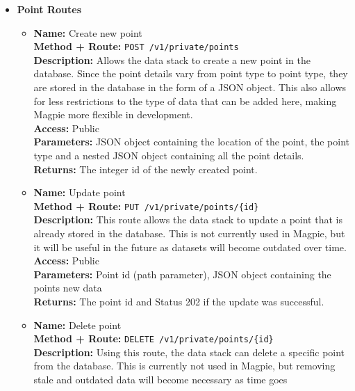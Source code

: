 \begin{itemize}
  \item {
    \textbf{Point Routes}
    \begin{itemize}
      \item {
        \textbf{Name:} Create new point\\
        \textbf{Method + Route:} \texttt{POST /v1/private/points}\\
        \textbf{Description:} Allows the data stack to create a new point in the
        database. Since the point details vary from point type to point type,
        they are stored in the database in the form of a JSON object. This also
        allows for less restrictions to the type of data that can be added here,
        making Magpie more flexible in development.\\
        \textbf{Access:} Public\\
        \textbf{Parameters:} JSON object containing the location of the point,
        the point type and a nested JSON object containing all the point
        details.\\
        \textbf{Returns:} The integer id of the newly created point.\\
      }
      \item {
        \textbf{Name:} Update point\\
        \textbf{Method + Route:} \texttt{PUT /v1/private/points/\{id\}}\\
        \textbf{Description:} This route allows the data stack to update a point
        that is already stored in the database. This is not currently used in
        Magpie, but it will be useful in the future as datasets will become
        outdated over time.\\
        \textbf{Access:} Public\\
        \textbf{Parameters:} Point id (path parameter), JSON object containing
        the points new data\\
        \textbf{Returns:} The point id and Status 202 if the update was
        successful.\\
      }
      \item {
        \textbf{Name:} Delete point\\
        \textbf{Method + Route:} \texttt{DELETE /v1/private/points/\{id\}}\\
        \textbf{Description:} Using this route, the data stack can delete a
        specific point from the database. This is currently not used in Magpie,
        but removing stale and outdated data will become necessary as time goes
}
\end{itemize}}
\end{itemize}
